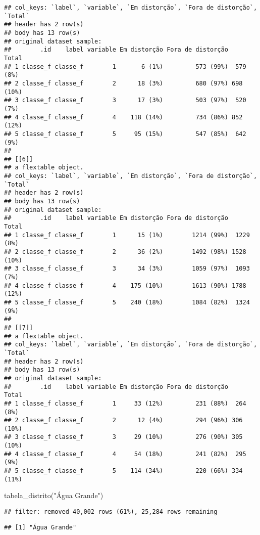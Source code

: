 \documentclass[
]{article}
\newenvironment{Shaded}{\begin{snugshade}}{\end{snugshade}}
\newcommand{\FunctionTok}[1]{\textcolor[rgb]{0.00,0.00,0.00}{#1}}
\newcommand{\NormalTok}[1]{#1}
\newcommand{\StringTok}[1]{\textcolor[rgb]{0.31,0.60,0.02}{#1}}
\begin{document}
\begin{verbatim}
## col_keys: `label`, `variable`, `Em distorção`, `Fora de distorção`, `Total` 
## header has 2 row(s) 
## body has 13 row(s) 
## original dataset sample: 
##        .id    label variable Em distorção Fora de distorção     Total
## 1 classe_f classe_f        1       6 (1%)         573 (99%)  579 (8%)
## 2 classe_f classe_f        2      18 (3%)         680 (97%) 698 (10%)
## 3 classe_f classe_f        3      17 (3%)         503 (97%)  520 (7%)
## 4 classe_f classe_f        4    118 (14%)         734 (86%) 852 (12%)
## 5 classe_f classe_f        5     95 (15%)         547 (85%)  642 (9%)
## 
## [[6]]
## a flextable object.
## col_keys: `label`, `variable`, `Em distorção`, `Fora de distorção`, `Total` 
## header has 2 row(s) 
## body has 13 row(s) 
## original dataset sample: 
##        .id    label variable Em distorção Fora de distorção      Total
## 1 classe_f classe_f        1      15 (1%)        1214 (99%)  1229 (8%)
## 2 classe_f classe_f        2      36 (2%)        1492 (98%) 1528 (10%)
## 3 classe_f classe_f        3      34 (3%)        1059 (97%)  1093 (7%)
## 4 classe_f classe_f        4    175 (10%)        1613 (90%) 1788 (12%)
## 5 classe_f classe_f        5    240 (18%)        1084 (82%)  1324 (9%)
## 
## [[7]]
## a flextable object.
## col_keys: `label`, `variable`, `Em distorção`, `Fora de distorção`, `Total` 
## header has 2 row(s) 
## body has 13 row(s) 
## original dataset sample: 
##        .id    label variable Em distorção Fora de distorção     Total
## 1 classe_f classe_f        1     33 (12%)         231 (88%)  264 (8%)
## 2 classe_f classe_f        2      12 (4%)         294 (96%) 306 (10%)
## 3 classe_f classe_f        3     29 (10%)         276 (90%) 305 (10%)
## 4 classe_f classe_f        4     54 (18%)         241 (82%)  295 (9%)
## 5 classe_f classe_f        5    114 (34%)         220 (66%) 334 (11%)
\end{verbatim}

\begin{Shaded}
\begin{Highlighting}[]
\FunctionTok{tabela\_distrito}\NormalTok{(}\StringTok{"Água Grande"}\NormalTok{)}
\end{Highlighting}
\end{Shaded}

\begin{verbatim}
## filter: removed 40,002 rows (61%), 25,284 rows remaining
\end{verbatim}

\begin{verbatim}
## [1] "Água Grande"
\end{verbatim}
\end{document}

